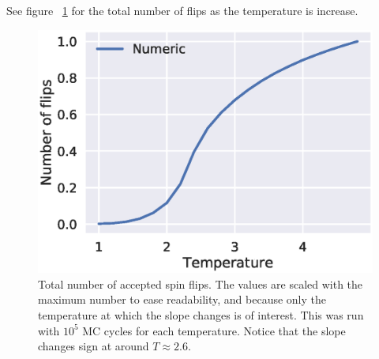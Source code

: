 \documentclass[aps,reprint]{revtex4-1}
\begin{document}
See figure ~\ref{fig:4cFlips} for the total number of flips as the temperature
is increase.
\begin{figure}
  \includegraphics[width=\columnwidth]{figures/4c_number_of_flips.eps}
  \caption{Total number of accepted spin flips. The values are scaled with the
  maximum number to ease readability, and because only the temperature at which the
  slope changes is of interest. This was run with $10^5$ MC
  cycles for each temperature. Notice that the slope changes sign at around
  $T \approx 2.6$.}
  \label{fig:4cFlips}
\end{figure}
\end{document}
